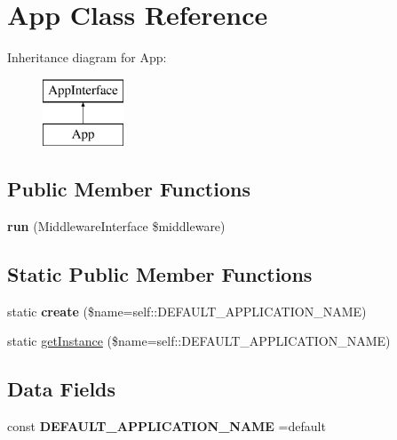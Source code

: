 \hypertarget{class_application_1_1_app}{}\section{App Class Reference}
\label{class_application_1_1_app}
Inheritance diagram for App\+:\begin{figure}[H]
\begin{center}
\leavevmode
\includegraphics[height=2.000000cm]{class_application_1_1_app}
\end{center}
\end{figure}
\subsection*{Public Member Functions}
\begin{DoxyCompactItemize}
\item 
\mbox{\label{class_application_1_1_app_a87bd41576d0ea68b4b1cb1f8466116c1}} 
{\bfseries run} (Middleware\+Interface \$middleware)
\end{DoxyCompactItemize}
\subsection*{Static Public Member Functions}
\begin{DoxyCompactItemize}
\item 
\mbox{\label{class_application_1_1_app_a119e97e03eca0773ba10a96a2c928760}} 
static {\bfseries create} (\$name=self\+::\+D\+E\+F\+A\+U\+L\+T\+\_\+\+A\+P\+P\+L\+I\+C\+A\+T\+I\+O\+N\+\_\+\+N\+A\+ME)
\item 
static \mbox{\hyperlink{class_application_1_1_app_af9184f047ad24cd760b3d521823741e5}{get\+Instance}} (\$name=self\+::\+D\+E\+F\+A\+U\+L\+T\+\_\+\+A\+P\+P\+L\+I\+C\+A\+T\+I\+O\+N\+\_\+\+N\+A\+ME)
\end{DoxyCompactItemize}
\subsection*{Data Fields}
\begin{DoxyCompactItemize}
\item 
\mbox{\label{class_application_1_1_app_a6e036b17c0cc546e66d47152268e128a}} 
const {\bfseries D\+E\+F\+A\+U\+L\+T\+\_\+\+A\+P\+P\+L\+I\+C\+A\+T\+I\+O\+N\+\_\+\+N\+A\+ME} =\textquotesingle{}default\textquotesingle{}
\end{DoxyCompactItemize}

